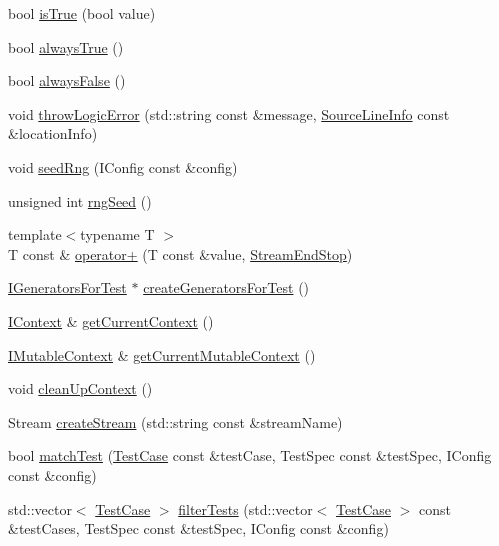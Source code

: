 \begin{DoxyCompactItemize}
bool \hyperlink{namespaceCatch_ae3bc6c6677e64e6eaa720dc3add31852}{is\-True} (bool value)
\item 
bool \hyperlink{namespaceCatch_a129be2186a2f6546206ec52c4bf2156f}{always\-True} ()
\item 
bool \hyperlink{namespaceCatch_ad425271249dd02956a9709e78b8b2783}{always\-False} ()
\item 
void \hyperlink{namespaceCatch_a702b612f683d154c466ea8297ed4a20d}{throw\-Logic\-Error} (std\-::string const \&message, \hyperlink{structCatch_1_1SourceLineInfo}{Source\-Line\-Info} const \&location\-Info)
\item 
void \hyperlink{namespaceCatch_a161400810eb0995394d6d8d3cae821ad}{seed\-Rng} (I\-Config const \&config)
\item 
unsigned int \hyperlink{namespaceCatch_acf5ea05e942d2d7fe79111e12754ed76}{rng\-Seed} ()
\item 
{\footnotesize template$<$typename T $>$ }\\T const \& \hyperlink{namespaceCatch_a5e95b3c47a7618db3649dc39b0bb9004}{operator+} (T const \&value, \hyperlink{structCatch_1_1StreamEndStop}{Stream\-End\-Stop})
\item 
\hyperlink{structCatch_1_1IGeneratorsForTest}{I\-Generators\-For\-Test} $\ast$ \hyperlink{namespaceCatch_a3d93b31e88fd01ee9e0d20757ff64eab}{create\-Generators\-For\-Test} ()
\item 
\hyperlink{structCatch_1_1IContext}{I\-Context} \& \hyperlink{namespaceCatch_ad517cca9b21deb79101e90e5508dd161}{get\-Current\-Context} ()
\item 
\hyperlink{structCatch_1_1IMutableContext}{I\-Mutable\-Context} \& \hyperlink{namespaceCatch_af7bb0c32ab2453d2f53e92a96d15360e}{get\-Current\-Mutable\-Context} ()
\item 
void \hyperlink{namespaceCatch_ae50508f10ffc4ed873a31a4db4caea16}{clean\-Up\-Context} ()
\item 
Stream \hyperlink{namespaceCatch_ad7591011c5d99d59504ecd3384001c3e}{create\-Stream} (std\-::string const \&stream\-Name)
\item 
bool \hyperlink{namespaceCatch_aadef80fbc6bc84589777a462770cef49}{match\-Test} (\hyperlink{classCatch_1_1TestCase}{Test\-Case} const \&test\-Case, Test\-Spec const \&test\-Spec, I\-Config const \&config)
\item 
std\-::vector$<$ \hyperlink{classCatch_1_1TestCase}{Test\-Case} $>$ \hyperlink{namespaceCatch_ab5da9aa67c42a3f626aea07d0b556829}{filter\-Tests} (std\-::vector$<$ \hyperlink{classCatch_1_1TestCase}{Test\-Case} $>$ const \&test\-Cases, Test\-Spec const \&test\-Spec, I\-Config const \&config)

\end{DoxyCompactItemize}
